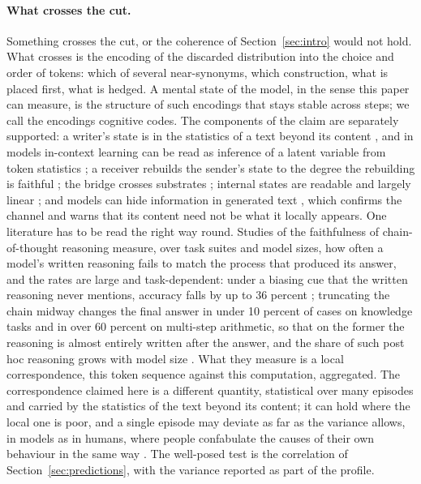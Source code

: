 \paragraph{What crosses the cut.}
Something crosses the cut, or the coherence of Section~\ref{sec:intro} would not hold. What crosses is
the encoding of the discarded distribution into the choice and order of tokens: which of several
near-synonyms, which construction, what is placed first, what is hedged. A mental state of the model,
in the sense this paper can measure, is the structure of such encodings that stays stable across
steps; we call the encodings cognitive codes. The components of the claim are separately supported: a
writer's state is in the statistics of a text beyond its content \citep{tausczik2010,pennebaker2011},
and in models in-context learning can be read as inference of a latent variable from token statistics
\citep{xie2022}; a receiver rebuilds the sender's state to the degree the rebuilding is faithful
\citep{stephens2010,hasson2012,zwaan1998}; the bridge crosses substrates
\citep{schrimpf2021,goldstein2022,caucheteux2022}; internal states are readable and largely linear
\citep{zou2023,park2024}; and models can hide information in generated text \citep{roger2023}, which
confirms the channel and warns that its content need not be what it locally appears. One literature
has to be read the right way round. Studies of the faithfulness of chain-of-thought reasoning
measure, over task suites and model sizes, how often a model's written reasoning fails to match the
process that produced its answer, and the rates are large and task-dependent: under a biasing cue
that the written reasoning never mentions, accuracy falls by up to 36 percent \citep{turpin2023};
truncating the chain midway changes the final answer in under 10 percent of cases on knowledge tasks
and in over 60 percent on multi-step arithmetic, so that on the former the reasoning is almost
entirely written after the answer, and the share of such post hoc reasoning grows with model size
\citep{lanham2023}. What they measure is a local correspondence, this token sequence against this
computation, aggregated. The correspondence claimed here is a different quantity, statistical over
many episodes and carried by the statistics of the text beyond its content; it can hold where the
local one is poor, and a single episode may deviate as far as the variance allows, in models as in
humans, where people confabulate the causes of their own behaviour in the same way
\citep{nisbett1977}. The well-posed test is the correlation of Section~\ref{sec:predictions}, with the
variance reported as part of the profile.

